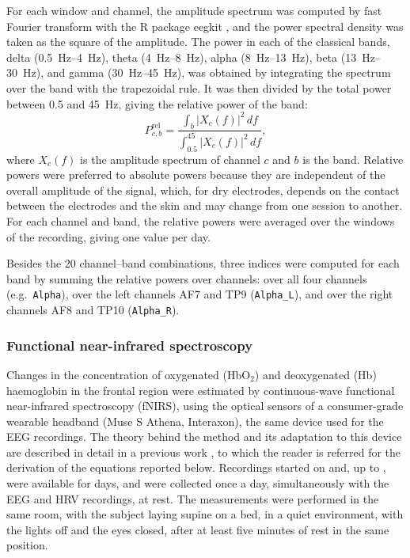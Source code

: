 \documentclass[11pt,a4paper]{article}
\begin{document}
For each window and channel, the amplitude spectrum was computed by fast Fourier
transform with the R package eegkit \citep{helwig_eegkit}, and the power spectral
density was taken as the square of the amplitude. The power in each of the classical
bands, delta (\SIrange{0.5}{4}{\hertz}), theta (\SIrange{4}{8}{\hertz}), alpha
(\SIrange{8}{13}{\hertz}), beta (\SIrange{13}{30}{\hertz}), and gamma
(\SIrange{30}{45}{\hertz}), was obtained by integrating the spectrum over the band with
the trapezoidal rule. It was then divided by the total power between 0.5 and
\SI{45}{\hertz}, giving the relative power of the band:
\begin{equation}
  P^{\mathrm{rel}}_{c,b} = \frac{\int_{b} |X_c(f)|^2\,df}{\int_{0.5}^{45} |X_c(f)|^2\,df},
\end{equation}
where $X_c(f)$ is the amplitude spectrum of channel $c$ and $b$ is the band. Relative
powers were preferred to absolute powers because they are independent of the overall
amplitude of the signal, which, for dry electrodes, depends on the contact between the
electrodes and the skin and may change from one session to another. For each channel
and band, the relative powers were averaged over the windows of the recording, giving
one value per day.

Besides the 20 channel--band combinations, three indices were computed for each band by
summing the relative powers over channels: over all four channels (e.g.\
\texttt{Alpha}), over the left channels AF7 and TP9 (\texttt{Alpha\_L}), and over the
right channels AF8 and TP10 (\texttt{Alpha\_R}). 

\subsubsection{Functional near-infrared spectroscopy}\label{sec:fnirs}

Changes in the concentration of oxygenated (HbO$_2$) and deoxygenated (Hb) haemoglobin
in the frontal region were estimated by continuous-wave functional near-infrared
spectroscopy (fNIRS), using the optical sensors of a consumer-grade wearable headband
(Muse S Athena, Interaxon), the same device used for the EEG recordings. The theory
behind the method and its adaptation to this device are described in detail in a
previous work \citep{maccallini2026fnirs}, to which the reader is referred for the
derivation of the equations reported below. Recordings started on \fnirsStart{} and, 
up to \fnirsEnd{}, were available for \fnirsDays{} days, and were collected once a day, 
simultaneously with the EEG and HRV recordings, at rest. The measurements were performed in the same room, 
with the subject laying supine on a bed, in a quiet environment, with the lights 
off and the eyes closed, after at least five minutes of rest in the same position. 
\end{document}
